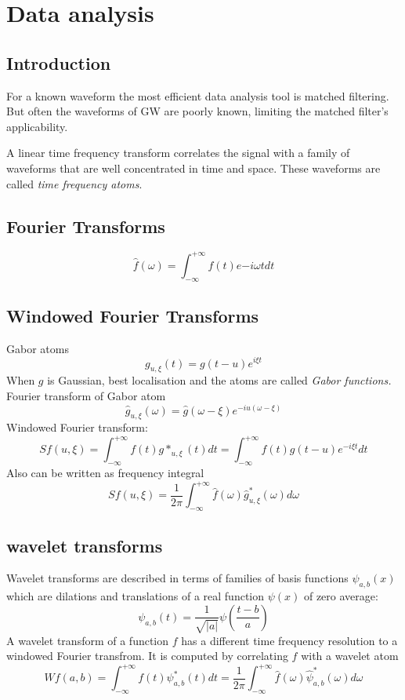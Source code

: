 


\chapter{Data analysis}           
\section{Introduction}     
For a known waveform the most efficient data analysis tool is matched filtering. But often the waveforms of GW are poorly known, limiting the matched filter's applicability. 

A linear time frequency transform correlates the signal with a family of waveforms that are well concentrated in time and space. These waveforms are called \textit{time frequency atoms}.

\section{Fourier Transforms}
\[\hat{f}(\omega)=\int^{+\infty}_{-\infty}f(t)e{-i\omega t}dt \]

\section{Windowed Fourier Transforms}
Gabor atoms 
\[ g_{u,\xi} (t)=g(t-u)e^{i\xi t} \]
When $g$ is Gaussian, best localisation and the atoms are called \textit{Gabor functions.} Fourier transform of Gabor atom
\[ \hat{g}_{u,\xi} (\omega) =\hat{g}(\omega-\xi) e^{-iu(\omega-\xi)} \]
Windowed Fourier transform:
\[ Sf(u,\xi)=\int^{+\infty}_{-\infty}f(t)g*_{u,\xi}(t)dt=\int^{+\infty}_{-\infty}f(t)g(t-u)e^{-i\xi t}dt \]
Also can be written as frequency integral
\[ Sf(u,\xi)=\frac{1}{2\pi}\int^{+\infty}_{-\infty}\hat{f}(\omega)\hat{g}^{*}_{u,\xi}(\omega)d\omega \]

\section{wavelet transforms}
Wavelet transforms are described in terms of families of basis functions $\psi_{a,b}(x)$ which are dilations and translations of a real function $\psi(x)$ of zero average:
\[ \psi_{a,b}(t)=\frac{1}{\sqrt{|a|}}\psi\left(\frac{t-b}{a}\right) \]
A wavelet transform of a function $f$ has a different time frequency resolution to a windowed Fourier transfrom. It is computed by correlating $f$ with a wavelet atom 
\[Wf(a,b)=\int^{+\infty}_{-\infty}f(t)\psi^{*}_{a,b}(t)dt=\frac{1}{2\pi}\int^{+\infty}_{-\infty} \hat{f}(\omega)\hat{\psi}^{*}_{a,b}(\omega) d\omega \]

